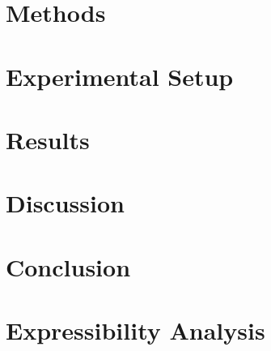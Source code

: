 \documentclass[twocolumn,prl,amsmath,amssymb,superscriptaddress]{revtex4-2}
\begin{document}
\section{Methods}
\label{sec:methods}


\section{Experimental Setup}
\label{sec:setup}


\section{Results}
\label{sec:results}


\section{Discussion}
\label{sec:discussion}


\section{Conclusion}
\label{sec:conclusion}


\appendix
\section{Expressibility Analysis}
\label{app:expressibility}



\end{document}
